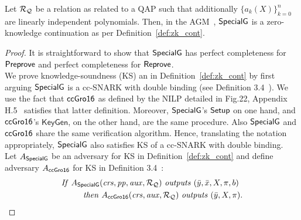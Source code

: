 \begin{theorem}
\label{sec_specialg}
Let $\mathcal{R}_{\mathcal{Q}}$ be a relation as related to a QAP such that additionally $\{a_k(X)\}_{k=0}^n$ are linearly independent polynomials. Then, in the 
AGM~\cite{Fuchs_AGM}, ${\mathsf{SpecialG}}$ is a zero-knowledge continuation as per Definition~\ref{def:zk_cont}. 
\end{theorem}
\begin{proof} It is straightforward to show that ${\mathsf{SpecialG}}$ has perfect completeness for ${\mathsf{Preprove}}$ and perfect completeness 
for ${\mathsf{Reprove}}$. \\

\noindent We prove knowledge-soundness (KS) an in Definition~\ref{def:zk_cont} by first arguing ${\mathsf{SpecialG}}$ is a cc-SNARK with double binding 
(see Definition 3.4~\cite{LegoSNARK}).  We use the fact that ${\mathsf{ccGro16}}$ as defined by the NILP detailed in Fig.22, Appendix H.5~\cite{LegoSNARK} 
satisfies that latter definition. Moreover, ${\mathsf{SpecialG}}$'s ${\mathsf{Setup}}$ on one hand, and ${\mathsf{ccGro16}}$'s $ \mathsf{KeyGen} $, on the other hand, are the same 
procedure. Also ${\mathsf{SpecialG}}$ and ${\mathsf{ccGro16}}$ share the same verification algorithm. Hence, translating the notation appropriately, ${\mathsf{SpecialG}}$ also 
satisfies KS of a cc-SNARK with double binding. \\

\noindent Let $A_{{\mathsf{SpecialG}}}$ be an adversary for KS in Definition~\ref{def:zk_cont} and 
define adversary $A_{{\mathsf{ccGro16}}}$ for KS in Definition 3.4~\cite{LegoSNARK}:
\begin{align*}
&\mathit{If} \ A_{\SpecialG} (\crs, \pp, \realaux, \relRQ)\ \mathit{outputs} \  (\bary, \barx, X, \pi, b) \\
&\ \ \ \ \ \ \ \ \mathit{then}\ A_{\ccgroth} (\crs, \realaux, \relRQ)\ \mathit{outputs} \ (\bary, X, \pi). 
\end{align*}


\end{proof}
